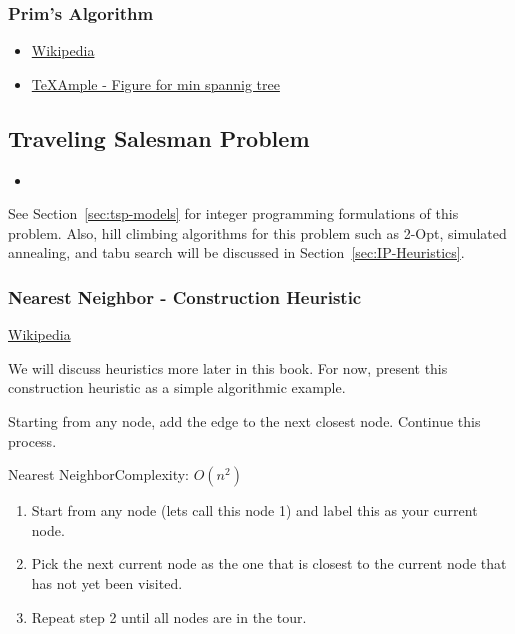 %

\subsubsection{Prim's Algorithm}
\begin{resource}
\begin{itemize}
\item \href{https://en.wikipedia.org/wiki/Prim\%27s_algorithm}{Wikipedia}
\item \href{http://www.texample.net/tikz/examples/prims-algorithm/}{TeXAmple - Figure for min spannig tree}
\end{itemize}
\end{resource}

\subsection{Traveling Salesman Problem}
\begin{resource}
\begin{itemize}
\item 
\end{itemize}
\end{resource}

See Section~\ref{sec:tsp-models} for integer programming formulations of this problem.  Also, hill climbing algorithms for this problem such as 2-Opt, simulated annealing, and tabu search will be discussed in Section~\ref{sec:IP-Heuristics}.

\subsubsection{Nearest Neighbor - Construction Heuristic}
\begin{resource}
\href{https://en.wikipedia.org/wiki/Nearest_neighbour_algorithm}{Wikipedia}
\end{resource}
We will discuss heuristics more later in this book.   For now, present this construction heuristic as a simple algorithmic example.   


Starting from any node, add the edge to the next closest node.  Continue this process.
\begin{general}{Nearest Neighbor}{Complexity: $O(n^2)$}
\label{heuristic:nearestNeighbor}
\begin{enumerate}
\item Start from any node (lets call this node 1) and label this as your current node.
\item Pick the next current node as the one that is closest to the current node that has not yet been visited.
\item Repeat step 2 until all nodes are in the tour.
\end{enumerate}
\end{general}

